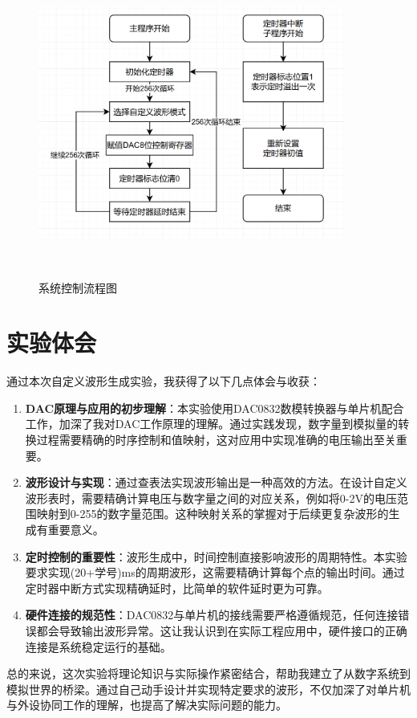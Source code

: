 \documentclass[12pt,hyperref,a4paper,UTF8]{ctexart}
\begin{document}
\begin{figure}[H] %
        \centering
        \includegraphics[width=0.9\textwidth]{figures/301.png} %
        \caption{系统控制流程图} %
        \label{fig:example} %
\end{figure}



\section{实验体会}

通过本次自定义波形生成实验，我获得了以下几点体会与收获：

\begin{enumerate}
    \item \textbf{DAC原理与应用的初步理解}：本实验使用DAC0832数模转换器与单片机配合工作，加深了我对DAC工作原理的理解。通过实践发现，数字量到模拟量的转换过程需要精确的时序控制和值映射，这对应用中实现准确的电压输出至关重要。
    
    \item \textbf{波形设计与实现}：通过查表法实现波形输出是一种高效的方法。在设计自定义波形表时，需要精确计算电压与数字量之间的对应关系，例如将0-2V的电压范围映射到0-255的数字量范围。这种映射关系的掌握对于后续更复杂波形的生成有重要意义。
    
    \item \textbf{定时控制的重要性}：波形生成中，时间控制直接影响波形的周期特性。本实验要求实现(20+学号)ms的周期波形，这需要精确计算每个点的输出时间。通过定时器中断方式实现精确延时，比简单的软件延时更为可靠。
    
    \item \textbf{硬件连接的规范性}：DAC0832与单片机的接线需要严格遵循规范，任何连接错误都会导致输出波形异常。这让我认识到在实际工程应用中，硬件接口的正确连接是系统稳定运行的基础。
\end{enumerate}

总的来说，这次实验将理论知识与实际操作紧密结合，帮助我建立了从数字系统到模拟世界的桥梁。通过自己动手设计并实现特定要求的波形，不仅加深了对单片机与外设协同工作的理解，也提高了解决实际问题的能力。
\end{document}
